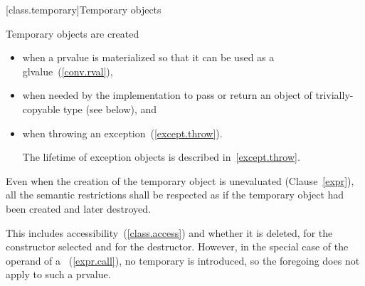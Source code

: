 [class.temporary]{Temporary objects}

\pnum
{}%
%
%
%
%
Temporary objects are created
\begin{itemize}
\item
when a prvalue is materialized so that it can be used as a glvalue~(\ref{conv.rval}),
\item
when needed by the implementation to pass or return an object of trivially-copyable type (see below),
and
\item
when throwing an exception~(\ref{except.throw}).
\begin{note}
The lifetime of exception objects is described in~\ref{except.throw}.
\end{note}
\end{itemize}
Even when the creation of the temporary object is
unevaluated (Clause~\ref{expr}),
all the semantic restrictions shall be respected as if the temporary object
had been created and later destroyed.
\begin{note}
This includes accessibility~(\ref{class.access}) and whether it is deleted,
for the constructor selected and for the destructor. However, in the special
case of the operand of a
~(\ref{expr.call}), no temporary is introduced,
so the foregoing does not apply to such a prvalue.
\end{note}

